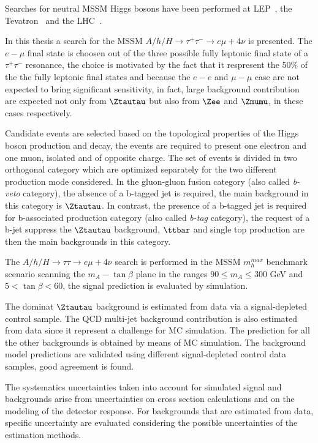 Searches for neutral MSSM Higgs bosons have been performed at
LEP~\cite{LEPLimits}, the
Tevatron~\cite{TevatronLimits1}
and the LHC~\cite{CMSLimit, ATLASLimit}. 

In this thesis a search for the MSSM 
$A/h/H \rightarrow \tau^+ \tau^- \rightarrow e \mu +4\nu$ is presented. The $e-\mu$ final state 
is choosen out of the three possible fully 
leptonic final state of a $\tau^+ \tau^-$ resonance,
the choice is motivated by the fact that it respresent the 50\% of the the fully leptonic final states and 
because the $e-e$ and $\mu-\mu$ case are not expected to bring significant sensitivity, in fact, large background
contribution are expected not only from $\Ztautau$ but also from $\Zee$ and $\Zmumu$, in these cases respectively.

Candidate events are selected based on the topological properties of the Higgs boson production
and decay, the events are required to present one electron and one muon, isolated and of opposite charge.
The set of events is divided in two orthogonal category which are optimized separately
for the two different production mode considered. In the gluon-gluon fusion category (also called \emph{b-veto} category),
the absence of a b-tagged jet is required, the main background in this category is $\Ztautau$. 
In contrast, the presence of a b-tagged jet is required for b-associated production category (also called 
\emph{b-tag} category), the request of a b-jet suppress the $\Ztautau$ background, $\ttbar$ and single top production
are then the main backgrounds in this category.

The $A/h/H \rightarrow\tau\tau \rightarrow e\mu+ 4\nu$ search is performed in the MSSM $m_h^{max}$ benchmark scenario
scanning the $m_A - \tan\beta$ plane in the ranges $90 \leq m_A \leq 300$ GeV and $5 < \tan\beta < 60$,
the signal prediction is evaluated by simulation.

The dominat $\Ztautau$ background is estimated from data via a signal-depleted control sample.
The  QCD multi-jet background contribution is also estimated from data since it represent a challenge for MC simulation.  
The prediction for all the other backgrounds is obtained by means of MC simulation.
The background model predictions are validated using different signal-depleted control data samples, 
good agreement is found.

The systematics uncertainties taken into account for simulated signal and backgrounds arise from uncertainties on  
cross section calculations and on the modeling of the detector response. For backgrounds that are estimated from data,
specific uncertainty are evaluated considering the possible uncertainties of the estimation methods.



